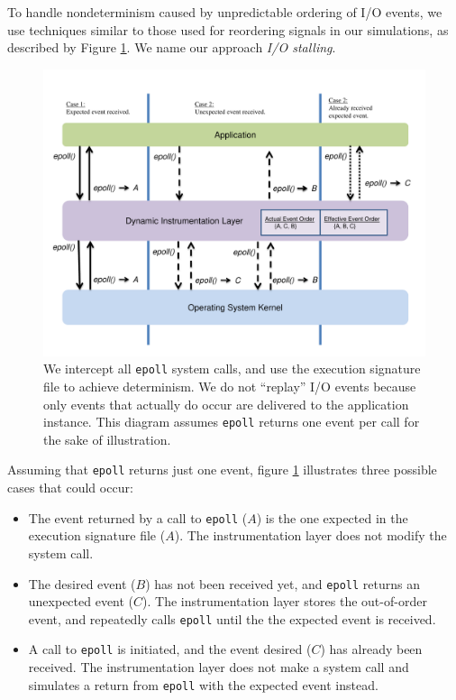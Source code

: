  \newline
To handle nondeterminism caused by unpredictable
ordering of I/O events,
we use techniques similar to those used 
for reordering signals in our simulations,
as described by Figure \ref{ch3:reorderfig}.
We name our approach {\em I/O stalling}.

\begin{figure}[h]
  \center
  \includegraphics[trim=0cm 1.25cm 0cm 0.75cm, scale=0.60]{epoll.pdf}
  \caption[Reordering I/O events using Pin]%
    {We intercept all \texttt{epoll} system calls,
    and use the execution signature file to
    achieve determinism. We do not ``replay'' I/O
    events because only events that actually do occur
    are delivered to the application instance. This
    diagram assumes \texttt{epoll} returns one event
    per call for the sake of illustration. }       
  \label{ch3:reorderfig}
\end{figure} 
              
Assuming that \texttt{epoll} returns just one event, figure
\ref{ch3:reorderfig} illustrates three possible cases that could occur:
\begin{itemize}
    \item The event returned by a call to \texttt{epoll} ($A$) is the one expected
    in the execution signature file ($A$). The instrumentation layer
    does not modify the system call.
    \item The desired event ($B$) has not been received yet,
    and \texttt{epoll} returns an unexpected event ($C$).
    The instrumentation layer stores the out-of-order event,
    and repeatedly calls \texttt{epoll} until the 
    the expected event is received.
    \item  A call to \texttt{epoll} is initiated, and the
    event desired ($C$) has already been received.
    The instrumentation layer does not 
    make a system call and simulates a return
    from \texttt{epoll} with the expected event instead.
\end{itemize}


